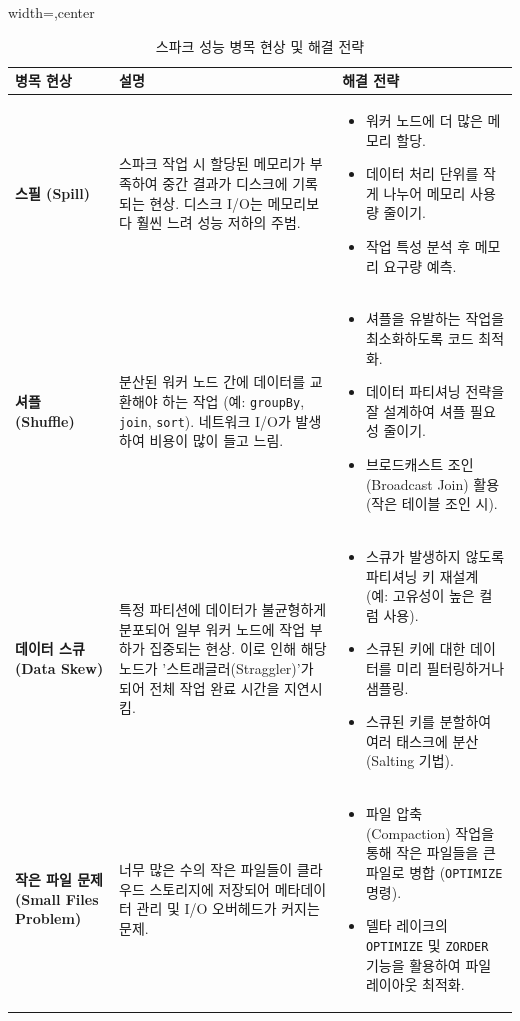 \documentclass[11pt,a4paper]{article}
\begin{document}
\begin{table}[htbp]
\centering
\caption{스파크 성능 병목 현상 및 해결 전략}
\label{tab:spark_bottlenecks}
\begin{adjustbox}{width=\textwidth,center}
\begin{tabular}{p{3cm} p{5cm} p{7cm}}
\toprule
\textbf{병목 현상} & \textbf{설명} & \textbf{해결 전략} \\
\midrule
\textbf{스필 (Spill)} & 스파크 작업 시 할당된 메모리가 부족하여 중간 결과가 디스크에 기록되는 현상. 디스크 I/O는 메모리보다 훨씬 느려 성능 저하의 주범. &
\begin{itemize}
    \item 워커 노드에 더 많은 메모리 할당.
    \item 데이터 처리 단위를 작게 나누어 메모리 사용량 줄이기.
    \item 작업 특성 분석 후 메모리 요구량 예측.
\end{itemize} \\
\textbf{셔플 (Shuffle)} & 분산된 워커 노드 간에 데이터를 교환해야 하는 작업 (예: \texttt{groupBy}, \texttt{join}, \texttt{sort}). 네트워크 I/O가 발생하여 비용이 많이 들고 느림. &
\begin{itemize}
    \item 셔플을 유발하는 작업을 최소화하도록 코드 최적화.
    \item 데이터 파티셔닝 전략을 잘 설계하여 셔플 필요성 줄이기.
    \item 브로드캐스트 조인(Broadcast Join) 활용 (작은 테이블 조인 시).
\end{itemize} \\
\textbf{데이터 스큐 (Data Skew)} & 특정 파티션에 데이터가 불균형하게 분포되어 일부 워커 노드에 작업 부하가 집중되는 현상. 이로 인해 해당 노드가 '스트래글러(Straggler)'가 되어 전체 작업 완료 시간을 지연시킴. &
\begin{itemize}
    \item 스큐가 발생하지 않도록 파티셔닝 키 재설계 (예: 고유성이 높은 컬럼 사용).
    \item 스큐된 키에 대한 데이터를 미리 필터링하거나 샘플링.
    \item 스큐된 키를 분할하여 여러 태스크에 분산 (Salting 기법).
\end{itemize} \\
\textbf{작은 파일 문제 (Small Files Problem)} & 너무 많은 수의 작은 파일들이 클라우드 스토리지에 저장되어 메타데이터 관리 및 I/O 오버헤드가 커지는 문제. &
\begin{itemize}
    \item 파일 압축(Compaction) 작업을 통해 작은 파일들을 큰 파일로 병합 (\texttt{OPTIMIZE} 명령).
    \item 델타 레이크의 \texttt{OPTIMIZE} 및 \texttt{ZORDER} 기능을 활용하여 파일 레이아웃 최적화.
\end{itemize} \\
\bottomrule
\end{tabular}
\end{adjustbox}
\end{table}
\end{document}
